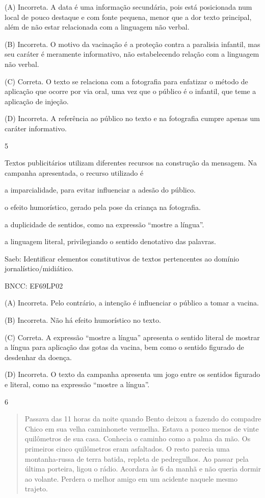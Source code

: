 (A) Incorreta. A data é uma informação secundária, pois está posicionada
num local de pouco destaque e com fonte pequena, menor que a dor texto
principal, além de não estar relacionada com a linguagem não verbal.

(B) Incorreta. O motivo da vacinação é a proteção contra a paralisia
infantil, mas seu caráter é meramente informativo, não estabelecendo
relação com a linguagem não verbal.

(C) Correta. O texto se relaciona com a fotografia para enfatizar o
método de aplicação que ocorre por via oral, uma vez que o público é o
infantil, que teme a aplicação de injeção.

(D) Incorreta. A referência ao público no texto e na fotografia cumpre
apenas um caráter informativo.

\num{5}

Textos publicitários utilizam diferentes recursos na construção da
mensagem. Na campanha apresentada, o recurso utilizado é

\begin{escolha}
\item
a imparcialidade, para evitar influenciar a adesão do público.
\item
o efeito humorístico, gerado pela pose da criança na fotografia.
\item
a duplicidade de sentidos, como na expressão ``mostre a língua''.
\item
a linguagem literal, privilegiando o sentido denotativo das palavras.
\end{escolha}

Saeb: Identificar elementos constitutivos de textos pertencentes ao
domínio jornalístico/midiático.

BNCC: EF69LP02

(A) Incorreta. Pelo contrário, a intenção é influenciar o público a
tomar a vacina.

(B) Incorreta. Não há efeito humorístico no texto.

(C) Correta. A expressão ``mostre a língua'' apresenta o sentido literal
de mostrar a língua para aplicação das gotas da vacina, bem como o
sentido figurado de desdenhar da doença.

(D) Incorreta. O texto da campanha apresenta um jogo entre os sentidos
figurado e literal, como na expressão ``mostre a língua''.

\num{6}

\begin{quote}
Passava das 11 horas da noite quando Bento deixou a fazendo do compadre
Chico em sua velha caminhonete vermelha. Estava a pouco menos de vinte
quilômetros de sua casa. Conhecia o caminho como a palma da mão. Os
primeiros cinco quilômetros eram asfaltados. O resto parecia uma
montanha-russa de terra batida, repleta de pedregulhos. Ao passar pela
última porteira, ligou o rádio. Acordara às 6 da manhã e não queria
dormir ao volante. Perdera o melhor amigo em um acidente naquele mesmo
trajeto.
\end{quote}

